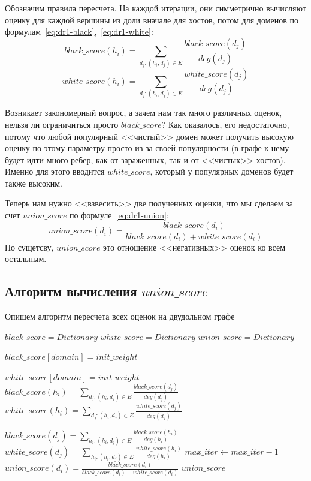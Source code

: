 \documentclass[a4paper,14pt]{extreport} %
\begin{document}
Обозначим правила пересчета. На каждой итерации, они симметрично вычисляют оценку для каждой вершины из доли вначале для хостов, потом для доменов по формулам~\ref{eq:dr1-black},~\ref{eq:dr1-white}:
\begin{equation}
	\label{eq:dr1-black}
	black\_score(h_i) = \sum_{d_j: (h_i, d_j)\in E} \frac{black\_score(d_j)}{deg(d_j)}
\end{equation}
\begin{equation}
	\label{eq:dr1-white}
	white\_score(h_i) = \sum_{d_j: (h_i, d_j)\in E} \frac{white\_score(d_j)}{deg(d_j)}
\end{equation}
	
Возникает закономерный вопрос, а зачем нам так много различных оценок, нельзя ли ограничиться просто $black\_score$? Как оказалось, его недостаточно, потому что любой популярный <<чистый>> домен может получить высокую оценку по этому параметру просто из за своей популярности (в графе к нему будет идти много ребер, как от зараженных, так и от <<чистых>> хостов). Именно для этого вводится $white\_score$, который у популярных доменов будет также высоким.
	
Теперь нам нужно <<взвесить>> две полученных оценки, что мы сделаем за счет $union\_score$ по формуле~\ref{eq:dr1-union}:
\begin{equation}
	\label{eq:dr1-union}
	union\_score(d_i) = \frac{black\_score(d_i)}{black\_score(d_i) + white\_score(d_i)}
\end{equation}
По сущетсву, $union\_score$ это отношение <<негативных>> оценок ко всем остальным.

\subsection{Алгоритм вычисления $union\_score$}
\label{alg:us}
Опишем алгоритм пересчета всех оценок на двудольном графе
\begin{algorithmic}
	\State $black\_score = Dictionary$
	\State $white\_score = Dictionary$
	\State $union\_score = Dictionary$
				
				
	\State $black\_score[domain] = init\_weight$
	\EndFor
				
	\State $white\_score[domain] = init\_weight$
	\EndFor
	\State $black\_score(h_i) = \sum_{d_j: (h_i, d_j)\in E} \frac{black\_score(d_j)}{deg(d_j)}$
	\State $white\_score(h_i) = \sum_{d_j: (h_i, d_j)\in E} \frac{white\_score(d_j)}{deg(d_j)}$
	\EndFor
					
	\State $black\_score(d_j) = \sum_{h_i: (h_i, d_j)\in E} \frac{black\_score(h_i)}{deg(h_i)}$
	\State $white\_score(d_j) = \sum_{h_i: (h_i, d_j)\in E} \frac{white\_score(h_i)}{deg(h_i)}$
	\EndFor
	\State $max\_iter\gets max\_iter-1$
	\EndWhile
	\State $union\_score(d_i) = \frac{black\_score(d_i)}{black\_score(d_i) + white\_score(d_i)}$
	\EndFor
	\State \Return $union\_score$
	\EndFunction
\end{algorithmic}
	
\end{document}
